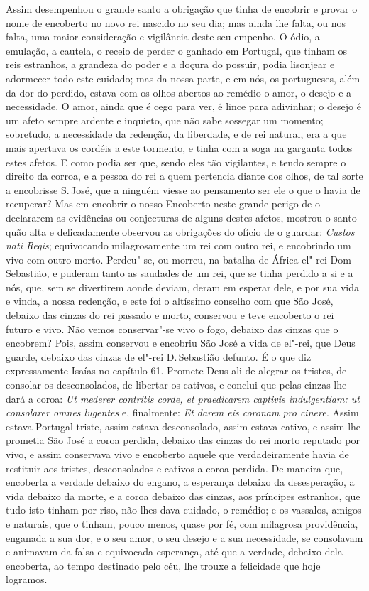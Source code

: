 Assim desempenhou o grande santo a obrigação que tinha de encobrir e
provar o nome de encoberto no novo rei nascido no seu dia; mas ainda lhe
falta, ou nos falta, uma maior consideração e vigilância deste seu
empenho. O ódio, a emulação, a cautela, o receio de perder o ganhado em
Portugal, que tinham os reis estranhos, a grandeza do poder e a doçura
do possuir, podia lisonjear e adormecer todo este cuidado; mas da nossa
parte, e em nós, os portugueses, além da dor do perdido, estava com os
olhos abertos ao remédio o amor, o desejo e a necessidade. O amor, ainda
que é cego para ver, é lince para adivinhar; o desejo é um afeto sempre
ardente e inquieto, que não sabe sossegar um momento; sobretudo, a
necessidade da redenção, da liberdade, e de rei natural, era a que mais
apertava os cordéis a este tormento, e tinha com a soga na garganta
todos estes afetos. E como podia ser que, sendo eles tão vigilantes, e
tendo sempre o direito da corroa, e a pessoa do rei a quem pertencia
diante dos olhos, de tal sorte a encobrisse S.\,José, que a ninguém
viesse ao pensamento ser ele o que o havia de recuperar? Mas em encobrir
o nosso Encoberto neste grande perigo de o declararem as evidências ou
conjecturas de alguns destes afetos, mostrou o santo quão alta e
delicadamente observou as obrigações do ofício de o guardar:
\emph{Custos nati Regis}; equivocando milagrosamente um rei com outro
rei, e encobrindo um vivo com outro morto. Perdeu"-se, ou morreu, na
batalha de África el"-rei Dom Sebastião, e puderam tanto as saudades de
um rei, que se tinha perdido a si e a nós, que, sem se divertirem aonde
deviam, deram em esperar dele, e por sua vida e vinda, a nossa redenção,
e este foi o altíssimo conselho com que São José, debaixo das cinzas do
rei passado e morto, conservou e teve encoberto o rei futuro e vivo. Não
vemos conservar"-se vivo o fogo, debaixo das cinzas que o encobrem? Pois,
assim conservou e encobriu São José a vida de el"-rei, que Deus guarde,
debaixo das cinzas de el"-rei D.\,Sebastião defunto. É o que diz
expressamente Isaías no capítulo 61. Promete Deus ali de alegrar os
tristes, de consolar os desconsolados, de libertar os cativos, e conclui
que pelas cinzas lhe dará a coroa: \emph{Ut mederer contritis corde, et
praedicarem captivis indulgentiam: ut consolarer omnes lugentes} e,
finalmente: \emph{Et darem eis coronam pro cinere.} Assim
estava Portugal triste, assim estava desconsolado, assim estava cativo,
e assim lhe prometia São José a coroa perdida, debaixo das cinzas do rei
morto reputado por vivo, e assim conservava vivo e encoberto aquele que
verdadeiramente havia de
restituir aos tristes, desconsolados e cativos a coroa perdida. De
maneira que, encoberta a verdade debaixo do engano, a esperança debaixo
da desesperação, a vida debaixo da morte, e a coroa debaixo das cinzas,
aos príncipes estranhos, que tudo isto tinham por riso, não lhes dava
cuidado, o remédio; e os vassalos, amigos e naturais, que o tinham,
pouco menos, quase por fé, com milagrosa providência, enganada a sua
dor, e o seu amor, o seu desejo e a sua necessidade, se consolavam e
animavam da falsa e equivocada esperança, até que a verdade, debaixo
dela encoberta, ao tempo destinado pelo céu, lhe trouxe a felicidade que
hoje logramos.

